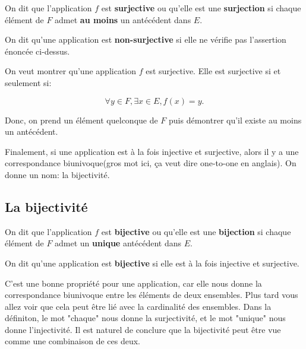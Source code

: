 \documentclass{article}
\begin{document}
\begin{tcolorbox}[colback=red!5!white,colframe=red!75!black,title=Définition 3.4]

On dit que l'application $f$ est \textbf{surjective} ou qu'elle est une \textbf{surjection} si chaque élément de $F$ admet \textbf{au moins} un antécédent dans $E$.

\tcblower

On dit qu'une application est \textbf{non-surjective} si elle ne vérifie pas l'assertion énoncée ci-dessus.

\end{tcolorbox}


\begin{tcolorbox}[colback=green!5!white,colframe=green!75!black,title=Point méthode 3.2]

On veut montrer qu'une application $f$ est surjective. Elle est surjective si et seulement si:

\[
\forall y \in F, \exists x \in E,  f(x) = y.
\]

Donc, on prend un élément quelconque de $F$ puis démontrer qu'il existe au moins un antécédent.



\end{tcolorbox}

Finalement, si une application est à la fois injective et surjective, alors il y a une correspondance biunivoque(gros mot ici, \c ca veut dire one-to-one en anglais). On donne un nom: la bijectivité.




\subsection{La bijectivité}

\begin{tcolorbox}[colback=red!5!white,colframe=red!75!black,title=Définition 3.5]

On dit que l'application $f$ est \textbf{bijective} ou qu'elle est une \textbf{bijection} si chaque élément de $F$ admet un \textbf{unique} antécédent dans $E$.

\tcblower

On dit qu'une application est \textbf{bijective} si elle est à la fois injective et surjective.
\end{tcolorbox}

C'est une bonne propriété pour une application, car elle nous donne la correspondance biunivoque entre les éléments de deux ensembles. Plus tard vous allez voir que cela peut être lié avec la cardinalité des ensembles. Dans la définiton, le mot "chaque" nous donne la surjectivité, et le mot "unique" nous donne l'injectivité. Il est naturel de conclure que la bijectivité peut être vue comme une combinaison de ces deux.
\end{document}
